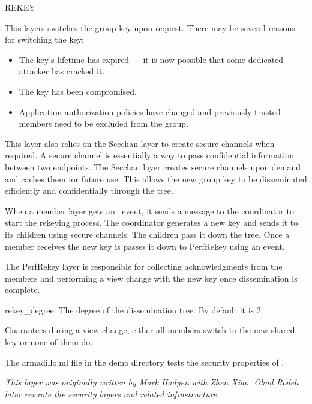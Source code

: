 \begin{Layer}{REKEY}

This layers switches the group key upon request. There may be several 
reasons for switching the key:
\begin{itemize}
\item The key's lifetime has expired --- it is now possible that some
dedicated attacker has cracked it.
\item The key has been compromised. 
\item Application authorization policies have changed and previously trusted
members need to be excluded from the group. 
\end{itemize}

This layer also relies on the Secchan layer to create secure
channels when required. A secure channel is essentially a way
to pass confidential information between two endpoints. The Secchan
layer creates secure channels upon demand and caches them for future
use. This allows the new group key to be disseminated efficiently and
confidentially through the tree. 

\begin{Protocol}
When a member layer gets an \ERekeyPrcl\ event, it sends a message to the
coordinator to start the rekeying process.  The coordinator generates
a new key and sends it to its children using secure channels. The
children pass it down the tree. Once a member receives the new key is
passes it down to PerfRekey using an  event.

The PerfRekey layer is responsible for collecting acknowledgments from the
members and performing a view change with the new key once
dissemination is complete. 
\end{Protocol}

\begin{Parameters}
\item {rekey\_degree:} The degree of the dissemination tree. By
default it is 2.
\end{Parameters}

\begin{Properties}
\item
Guarantees during a view change, either all members switch to the new
shared key or none of them do.
\end{Properties}

\begin{Sources}
\end{Sources}

\begin{GenEvent}
\end{GenEvent}

\begin{Testing}
\item 
The armadillo.ml file in the demo directory tests the security properties
of \ensemble.
\end{Testing}

\emph{This layer was originally written by Mark Hadyen with Zhen Xiao.
Ohad Rodeh later rewrote the security layers and related infrastructure.}
\end{Layer}


